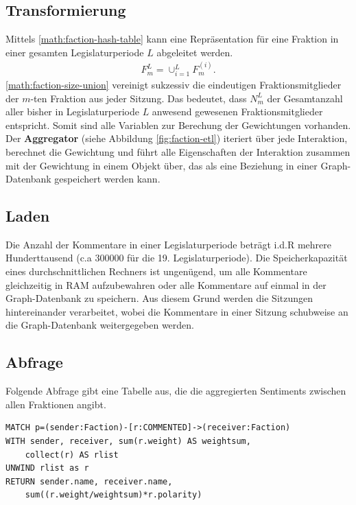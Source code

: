 \subsection{Transformierung}
Mittels \ref{math:faction-hash-table} kann eine Repräsentation für eine Fraktion in einer gesamten Legislaturperiode $L$ abgeleitet werden.
\begin{equation}
    \begin{aligned}
    \label{math:faction-size-union}
    F_{m}^{L} = \cup_{i=1}^{L} F_{m}^{(i)}.
    \end{aligned}
\end{equation}
\ref{math:faction-size-union} vereinigt sukzessiv die eindeutigen Fraktionsmitglieder der $m$-ten Fraktion aus jeder Sitzung. Das bedeutet, dass $N_m^{L}$ der Gesamtanzahl
aller bisher in Legislaturperiode $L$ anwesend gewesenen Fraktionsmitglieder entspricht. Somit sind alle Variablen zur Berechung der Gewichtungen vorhanden.\\
Der \textbf{Aggregator} (siehe Abbildung \ref{fig:faction-etl}) iteriert über jede Interaktion, berechnet die Gewichtung und führt alle Eigenschaften der
Interaktion zusammen mit der Gewichtung in einem Objekt über, das als eine Beziehung in einer Graph-Datenbank gespeichert werden kann. 
\subsection{Laden}
Die Anzahl der Kommentare in einer Legislaturperiode beträgt i.d.R mehrere Hunderttausend (c.a $300 000$ für die 19. Legislaturperiode). 
Die Speicherkapazität eines durchschnittlichen Rechners ist ungenügend, um alle Kommentare gleichzeitig in RAM aufzubewahren oder alle Kommentare auf einmal 
in der Graph-Datenbank zu speichern. Aus diesem Grund werden die Sitzungen hintereinander verarbeitet, wobei die Kommentare in einer Sitzung schubweise 
an die Graph-Datenbank weitergegeben werden.

\subsection{Abfrage}
Folgende Abfrage gibt eine Tabelle aus, die die aggregierten Sentiments zwischen allen Fraktionen angibt.
\begin{verbatim}
MATCH p=(sender:Faction)-[r:COMMENTED]->(receiver:Faction) 
WITH sender, receiver, sum(r.weight) AS weightsum,
	collect(r) AS rlist 
UNWIND rlist as r 
RETURN sender.name, receiver.name,
	sum((r.weight/weightsum)*r.polarity)
\end{verbatim}

